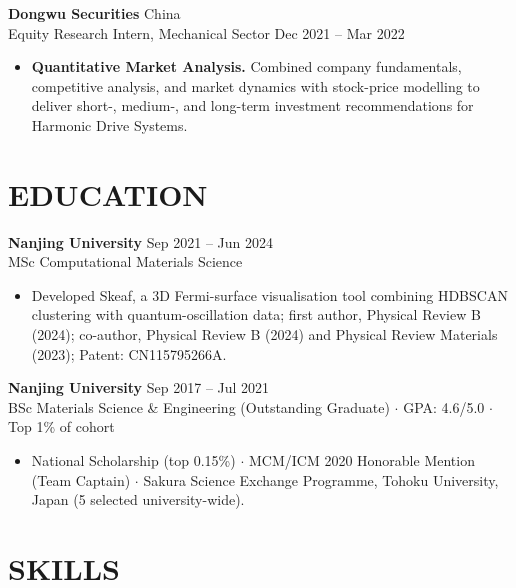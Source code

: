 \documentclass[a4paper,9pt]{article}
\begin{document}
\vspace{2pt}
\noindent\textbf{Dongwu Securities} \hfill China\\
Equity Research Intern, Mechanical Sector \hfill Dec 2021 -- Mar 2022
\begin{itemize}
    \item \textbf{Quantitative Market Analysis.} Combined company fundamentals, competitive analysis, and market dynamics with stock-price modelling to deliver short-, medium-, and long-term investment recommendations for Harmonic Drive Systems.
\end{itemize}

\section{EDUCATION}

\noindent\textbf{Nanjing University} \hfill Sep 2021 -- Jun 2024\\
MSc Computational Materials Science
\begin{itemize}
    \item Developed Skeaf, a 3D Fermi-surface visualisation tool combining HDBSCAN clustering with quantum-oscillation data; first author, Physical Review B (2024); co-author, Physical Review B (2024) and Physical Review Materials (2023); Patent: CN115795266A.
\end{itemize}

\vspace{2pt}
\noindent\textbf{Nanjing University} \hfill Sep 2017 -- Jul 2021\\
BSc Materials Science \& Engineering (Outstanding Graduate) \;$\cdot$\; GPA: 4.6/5.0 \;$\cdot$\; Top 1\% of cohort
\begin{itemize}
    \item National Scholarship (top 0.15\%) \;$\cdot$\; MCM/ICM 2020 Honorable Mention (Team Captain) \;$\cdot$\; Sakura Science Exchange Programme, Tohoku University, Japan (5 selected university-wide).
\end{itemize}

\section{SKILLS}
\end{document}
